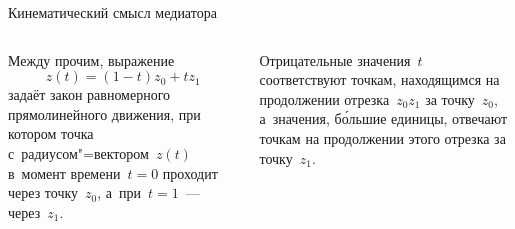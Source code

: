 \begin{frame}{Кинематический смысл медиатора}
\begin{columns}
Между прочим, выражение
	\[
	z(t)=(1-t)z_0+tz_1
	\]
задаёт закон равномерного прямолинейного движения, при котором точка
с~радиусом"=вектором~$z(t)$ в~момент времени~$t=0$ проходит через точку~$z_0$,
а~при~$t=1$~— через~$z_1$.

\bigskip
Отрицательные значения~$t$ соответствуют точкам, находящимся на продолжении
отрезка~$z_0z_1$ за точку~$z_0$, а~значения, бо́льшие единицы, отвечают точкам
на продолжении этого отрезка за точку~$z_1$.
\end{columns}
\end{frame}

